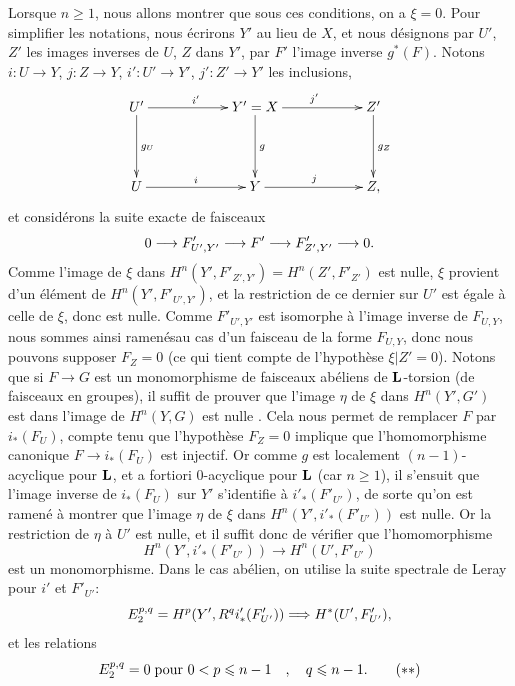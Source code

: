\documentclass[10pt]{../fichiers-configuration-latex/smfart}
\begin{document}
Lorsque $n\geq 1$, nous allons montrer que sous ces conditions, on a
$\xi=0$. Pour simplifier les notations, nous écrirons $Y'$ au lieu de
$X$, et nous désignons par $U'$, $Z'$ les images inverses de $U$, $Z$
dans $Y'$, par $F'$ l'image inverse $g^{\ast}(F)$. Notons
$i:U\rightarrow Y$, $j:Z\rightarrow Y$, $i':U'\rightarrow Y'$,
$j':Z'\rightarrow Y'$ les inclusions,
$$
\xymatrix@C=2cm@R=1.5cm{
U'  \ar[r]^{i'} \ar[d]^{g_U}& Y' = X  \ar[r]^{j'} \ar[d]^{g} & Z'  \ar[d]^{g_Z}\\
U   \ar[r]^{i} & Y  \ar[r]^{j} & Z,
}
$$
et considérons la suite exacte de faisceaux
$$
0\longrightarrow F'_{U',Y'}\longrightarrow F'\longrightarrow
F'_{Z',Y'}\longrightarrow 0{}.
$$
Comme l'image de $\xi$ dans $H^{n}(Y',F'_{Z',Y'})=H^{n}(Z',F'_{Z'})$
est nulle, $\xi$ provient d'un élément de $H^{n}(Y',F'_{U',Y'})$, et
la restriction de ce dernier sur $U'$ est égale à celle de $\xi$, donc
est nulle. Comme $F'_{U',Y'}$ est isomorphe à l'image inverse de
$F_{U,Y}$, nous sommes ainsi ramenés\pageoriginale au cas d'un
faisceau de la forme $F_{U,Y}$, donc nous pouvons supposer $F_Z=0$ (ce
qui tient compte de l'hypothèse $\xi|Z'=0$). Notons que si
$F\rightarrow G$ est un monomorphisme de faisceaux abéliens de
$\mathbf{L}$-torsion (\resp de faisceaux en groupes), il suffit de
prouver que l'image $\eta$ de $\xi$ dans $H^{n}(Y', G')$ est dans
l'image de $H^{n}(Y,G)$ \ie est nulle . Cela nous permet de
remplacer $F$ par $i_{\ast}(F_U)$, compte tenu que l'hypothèse $F_Z=0$
implique que l'homomorphisme canonique $F\rightarrow i_{\ast}(F_U)$
est injectif. Or comme $g$ est localement $(n-1)$-acyclique pour
$\mathbf{L}$, et a fortiori $0$-acyclique pour $\mathbf{L}$ (car
$n\geq 1$), il s'ensuit que l'image inverse de $i_{\ast}(F_U)$ sur
$Y'$ s'identifie à $i'_{\ast}(F'_{U'})$, de sorte qu'on est ramené à
montrer que l'image $\eta$ de $\xi$ dans
$H^{n}(Y',i'_{\ast}(F'_{U'}))$ est nulle. Or la restriction de $\eta$
à $U'$ est nulle, et il suffit donc de vérifier que l'homomorphisme
\begin{equation*}
H^{n}(Y',i'_{\ast}(F'_{U'}))\longrightarrow H^{n}(U',F'_{U'})\tag{$\ast$}
\end{equation*}
est un monomorphisme. Dans le cas abélien, on utilise la suite
spectrale de Leray pour $i'$ et $F'_{U'}$:
$$
E^{p,q}_2=H^p(Y',R^qi'_{\ast}(F'_{U'}))\Longrightarrow
H^{\ast}(U',F'_{U'}){},
$$
et les relations
\begin{equation*}
E^{p,q}_2=0\; \mbox{\rm pour } 0<p\leq n-1\quav q\leq n-1{\quoi}.\tag{${\ast}{\ast}$}
\end{equation*}
\end{document}

